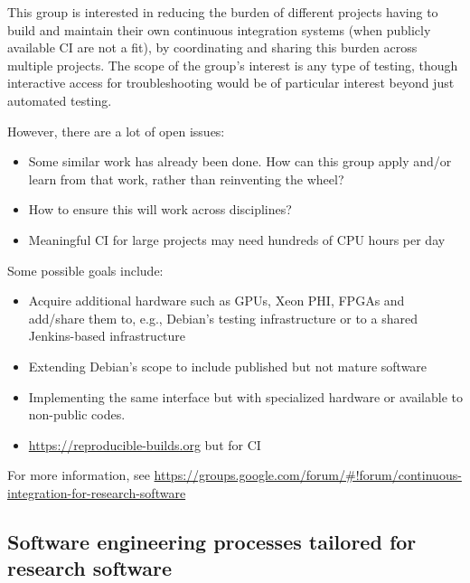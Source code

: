 \documentclass[11pt, oneside]{amsart}
\newcommand{\note}[1]{ {\textcolor{blueish}    { ***Note:      #1 }}}
\begin{document}
This group is interested in reducing the burden of different projects having to build and maintain their own continuous integration systems (when publicly available CI are not a fit), by coordinating and sharing this burden across multiple projects.
%
The scope of the group's interest is any type of testing, though interactive access for troubleshooting would be of particular interest beyond just automated testing.

However, there are a lot of open issues:
\begin{itemize}
\item Some similar work has already been done.  How can this group apply and/or learn from that work, rather than reinventing the wheel?
\item How to ensure this will work across disciplines?
\item Meaningful CI for large projects may need hundreds of CPU hours per day
\end{itemize}

Some possible goals include:
\begin{itemize}
\item Acquire additional hardware such as GPUs, Xeon PHI, FPGAs and add/share them to, e.g., Debian's testing infrastructure or to a shared Jenkins-based infrastructure
\item Extending Debian's scope to include published but not mature software
\item Implementing the same interface but with specialized hardware or available to non-public codes.
\item \url{https://reproducible-builds.org} but for CI
\end{itemize}

For more information, see \url{https://groups.google.com/forum/#!forum/continuous-integration-for-research-software}




\subsection{Software engineering processes tailored for research software}
\label{sec:soft-eng}

\end{document}
